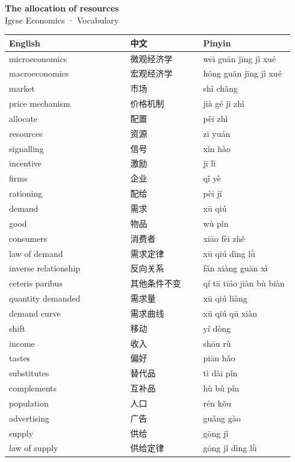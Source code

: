 \documentclass[11pt]{article}
\begin{document}
\begin{center}
  {\LARGE\bfseries The allocation of resources}\\[0.35em]
  {\large Igcse Economics · Vocabulary}
\end{center}
\vspace{0.6em}

\begin{longtable}{@{}p{0.40\linewidth}p{0.24\linewidth}p{0.30\linewidth}@{}}
\toprule
\textbf{English} & \textbf{中文} & \textbf{Pinyin} \\
\midrule
\endhead
\bottomrule
\endlastfoot
microeconomics & 微观经济学 & wēi guān jīng jì xué \\
macroeconomics & 宏观经济学 & hóng guān jīng jì xué \\
market & 市场 & shì chǎng \\
price mechanism & 价格机制 & jià gé jī zhì \\
allocate & 配置 & pèi zhì \\
resources & 资源 & zī yuán \\
signalling & 信号 & xìn hào \\
incentive & 激励 & jī lì \\
firms & 企业 & qǐ yè \\
rationing & 配给 & pèi jǐ \\
demand & 需求 & xū qiú \\
good & 物品 & wù pǐn \\
consumers & 消费者 & xiāo fèi zhě \\
law of demand & 需求定律 & xū qiú dìng lǜ \\
inverse relationship & 反向关系 & fǎn xiàng guān xì \\
ceteris paribus & 其他条件不变 & qí tā tiáo jiàn bù biàn \\
quantity demanded & 需求量 & xū qiú liàng \\
demand curve & 需求曲线 & xū qiú qū xiàn \\
shift & 移动 & yí dòng \\
income & 收入 & shōu rù \\
tastes & 偏好 & piān hǎo \\
substitutes & 替代品 & tì dài pǐn \\
complements & 互补品 & hù bǔ pǐn \\
population & 人口 & rén kǒu \\
advertising & 广告 & guǎng gào \\
supply & 供给 & gōng jǐ \\
law of supply & 供给定律 & gōng jǐ dìng lǜ \\

\end{longtable}
\end{document}
